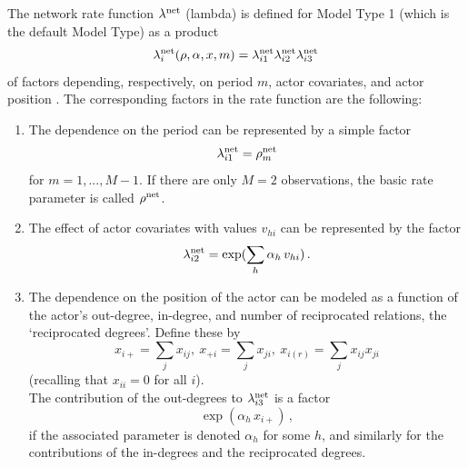 \documentclass[a4paper,fleqn]{article}
\newcommand{\+}{\, + \,}
\begin{document}
{The \hypertarget{T_rate}{network rate function} $\lambda^{\rm net}$
(lambda) is defined for Model Type 1 (which is the default Model
Type) as a product \[ \lambda^{\rm net}_i(\rho, \alpha, x, m) =
\lambda^{\rm net}_{i1} \lambda^{\rm net}_{i2} \lambda^{\rm net}_{i3}
\] of factors depending, respectively, on period $m$, actor
covariates, and actor position \citep[see][p.\ 383]{Snijders01}. The
corresponding factors in the rate function are the following:
\begin{enumerate}
 \item The dependence on the period can be represented by a simple factor
 \[ \lambda^{\rm net}_{i1} = \rho^{\rm net}_m \]
 for $m = 1, ..., M-1$. If there are only $M = 2 $ observations,
 \hypertarget{T_rho}{the basic rate parameter} is called $ \rho^{\rm net}$.

 \item The effect of actor covariates with values
 $v_{hi}$ can be represented by the factor
 \[ \lambda^{\rm net}_{i2} = \exp(\sum_h \alpha_h \, v_{hi})\,. \]

 \item The dependence on the position of the actor can be modeled
 as a function of the actor's out-degree, in-degree, and number
 of reciprocated relations, the `reciprocated degrees'.
 Define these by
 \[ x_{i+} = \sum_j x_{ij},\ x_{+i} = \sum_j x_{ji},\ x_{i(r)} = \sum_j x_{ij}x_{ji} \]
 (recalling that $x_{ii} = 0$ for all $i$).\\

The contribution of the out-degrees to $\lambda^{\rm net}_{i3}$
is a factor
 \[ \exp( \alpha_h \, x_{i+})\,, \]
if the associated parameter is denoted $\alpha_h$ for some $h$,
and similarly for the contributions of the in-degrees and the
reciprocated degrees.


\end{enumerate}}
\end{document}

